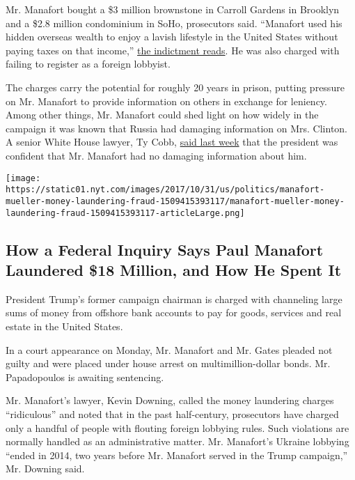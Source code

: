 Mr. Manafort bought a \$3 million brownstone in Carroll Gardens in
Brooklyn and a \$2.8 million condominium in SoHo, prosecutors said.
``Manafort used his hidden overseas wealth to enjoy a lavish lifestyle
in the United States without paying taxes on that income,''
\href{https://www.justice.gov/file/1007271/download}{the indictment
reads}. He was also charged with failing to register as a foreign
lobbyist.

The charges carry the potential for roughly 20 years in prison, putting
pressure on Mr. Manafort to provide information on others in exchange
for leniency. Among other things, Mr. Manafort could shed light on how
widely in the campaign it was known that Russia had damaging information
on Mrs. Clinton. A senior White House lawyer, Ty Cobb,
\href{https://www.nytimes.com/2017/10/28/us/politics/ty-cobb-trump-lawyer-new-washington.html}{said
last week} that the president was confident that Mr. Manafort had no
damaging information about him.

\href{https://www.nytimes.com/interactive/2017/10/31/us/politics/manafort-mueller-money-laundering-fraud.html}{}

\texttt{[image: https://static01.nyt.com/images/2017/10/31/us/politics/manafort-mueller-money-laundering-fraud-1509415393117/manafort-mueller-money-laundering-fraud-1509415393117-articleLarge.png]}

\hypertarget{how-a-federal-inquiry-says-paul-manafort-laundered-18-million-and-how-he-spent-it}{%
\subsection{How a Federal Inquiry Says Paul Manafort Laundered \$18
Million, and How He Spent
It}\label{how-a-federal-inquiry-says-paul-manafort-laundered-18-million-and-how-he-spent-it}}

President Trump's former campaign chairman is charged with channeling
large sums of money from offshore bank accounts to pay for goods,
services and real estate in the United States.

In a court appearance on Monday, Mr. Manafort and Mr. Gates pleaded not
guilty and were placed under house arrest on multimillion-dollar bonds.
Mr. Papadopoulos is awaiting sentencing.

Mr. Manafort's lawyer, Kevin Downing, called the money laundering
charges ``ridiculous'' and noted that in the past half-century,
prosecutors have charged only a handful of people with flouting foreign
lobbying rules. Such violations are normally handled as an
administrative matter. Mr. Manafort's Ukraine lobbying ``ended in 2014,
two years before Mr. Manafort served in the Trump campaign,'' Mr.
Downing said.


